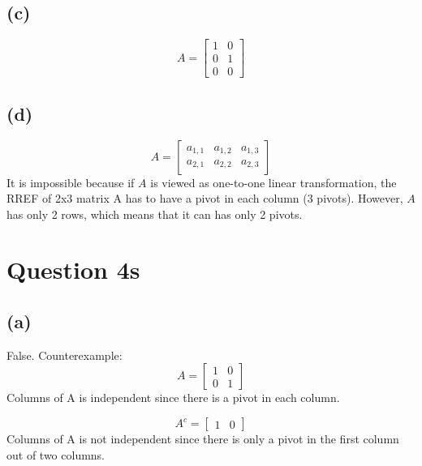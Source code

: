 \documentclass[10pt]{article}
\begin{document}
\subsection*{(c)}
\begin{equation*}
    A=
    \begin{bmatrix}
        1 & 0 \\
        0 & 1 \\
        0 & 0
    \end{bmatrix}
\end{equation*}


\subsection*{(d)}
\begin{equation*}
    A=
    \begin{bmatrix}
        a_{1,1} & a_{1,2} & a_{1,3} \\
        a_{2,1} & a_{2,2} & a_{2,3}
    \end{bmatrix}
\end{equation*}
\noindent It is impossible because if $A$ is viewed as one-to-one linear transformation, the RREF of 2x3 matrix A has to have a pivot in each column (3 pivots). However, $A$ has only 2 rows, which means that it can has only 2 pivots.





\section*{Question 4s}
\subsection*{(a)}

\noindent False.
\noindent Counterexample:
\begin{equation*}
    A=
    \begin{bmatrix}
        1 & 0 \\
        0 & 1
    \end{bmatrix}
\end{equation*}
\noindent Columns of A is independent since there is a pivot in each column.

\begin{equation*}
    A^c=
    \begin{bmatrix}
        1 & 0
    \end{bmatrix}
\end{equation*}
\noindent Columns of A is not independent since there is only a pivot in the first column out of two columns.
\end{document}
